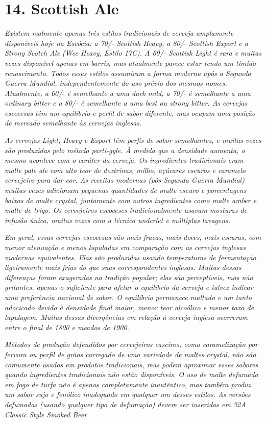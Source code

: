 \section*{14. Scottish Ale}
\textit{Existem realmente apenas três estilos tradicionais de cerveja amplamente disponíveis hoje na Escócia: a 70/- Scottish Heavy, a 80/- Scottish Export e a Strong Scotch Ale (Wee Heavy, Estilo 17C). A 60/- Scottish Light é rara e muitas vezes disponível apenas em barris, mas atualmente parece estar tendo um tímido renascimento. Todos esses estilos assumiram a forma moderna após a Segunda Guerra Mundial, independentemente do uso prévio dos mesmos nomes. Atualmente, a 60/- é semelhante a uma dark mild, a 70/- é semelhante a uma ordinary bitter e a 80/- é semelhante a uma best ou strong bitter. As cervejas escocesas têm um equilíbrio e perfil de sabor diferente, mas ocupam uma posição de mercado semelhante às cervejas inglesas.} 

\textit{As cervejas Light, Heavy e Export têm perfis de sabor semelhantes, e muitas vezes são produzidas pelo método parti-gyle. À medida que a densidade aumenta, o mesmo acontece com o caráter da cerveja. Os ingredientes tradicionais eram malte pale ale com alto teor de dextrinas, milho, açúcares escuros e caramelo cervejeiro para dar cor. As receitas modernas (pós-Segunda Guerra Mundial) muitas vezes adicionam pequenas quantidades de malte escuro e porcentagens baixas de malte crystal, juntamente com outros ingredientes como malte amber e malte de trigo. Os cervejeiros escoceses tradicionalmente usavam mosturas de infusão única, muitas vezes com a técnica underlet e múltiplas lavagens.}

\textit{Em geral, essas cervejas escocesas são mais fracas, mais doces, mais escuras, com menor atenuação e menos lupuladas em comparação com as cervejas inglesas modernas equivalentes. Elas são produzidas usando temperaturas de fermentação ligeiramente mais frias do que suas correspondentes inglesas. Muitas dessas diferenças foram exageradas na tradição popular; elas são perceptíveis, mas não gritantes, apenas o suficiente para afetar o equilíbrio da cerveja e talvez indicar uma preferência nacional de sabor. O equilíbrio permanece maltado e um tanto adocicado devido à densidade final maior, menor teor alcoólico e menor taxa de lupulagem. Muitas dessas divergências em relação à cerveja inglesa ocorreram entre o final de 1800 e meados de 1900.}

\textit{Métodos de produção defendidos por cervejeiros caseiros, como caramelização por fervura ou perfil de grãos carregado de uma variedade de maltes crystal, não são comumente usados em produtos tradicionais, mas podem aproximar esses sabores quando ingredientes tradicionais não estão disponíveis. O uso de malte defumado em fogo de turfa não é apenas completamente inautêntico, mas também produz um sabor sujo e fenólico inadequado em qualquer um desses estilos. As versões defumadas (usando qualquer tipo de defumação) devem ser inseridas em 32A Classic Style Smoked Beer. }

